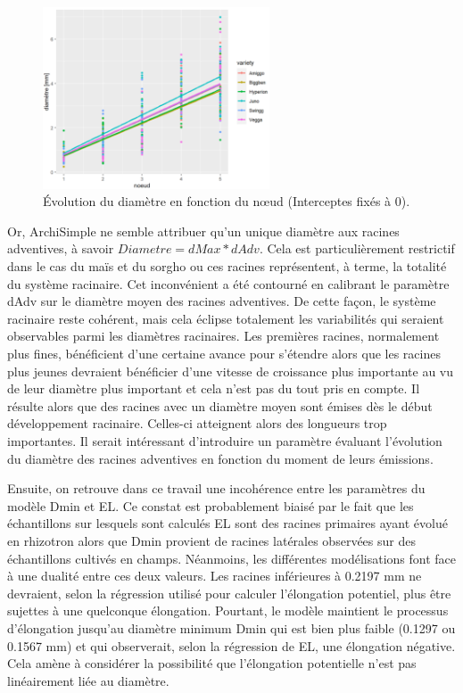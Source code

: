 \begin{figure}[ht]
\centering
\includegraphics[width=0.6\textwidth]{Image/node_dia.png}
\caption{Évolution du diamètre en fonction du nœud (Interceptes fixés à 0).}
\label{fig:node_dia}
\end{figure}

Or, ArchiSimple ne semble attribuer qu'un unique diamètre aux racines adventives, à savoir $Diametre = dMax*dAdv$.
Cela est particulièrement restrictif dans le cas du maïs et du sorgho ou ces racines représentent, à terme, la totalité du système racinaire.
Cet inconvénient a été contourné en calibrant le paramètre dAdv sur le diamètre moyen des racines adventives.
De cette façon, le système racinaire reste cohérent, mais cela éclipse totalement les variabilités qui seraient observables parmi les diamètres racinaires.
Les premières racines, normalement plus fines, bénéficient d'une certaine avance pour s'étendre alors que les racines plus jeunes devraient bénéficier d'une vitesse de croissance plus importante au vu de leur diamètre plus important et cela n'est pas du tout pris en compte.
Il résulte alors que des racines avec un diamètre moyen sont émises dès le début développement racinaire.
Celles-ci atteignent alors des longueurs trop importantes.
Il serait intéressant d'introduire un paramètre évaluant l'évolution du diamètre des racines adventives en fonction du moment de leurs émissions.
\newline

Ensuite, on retrouve dans ce travail une incohérence entre les paramètres du modèle Dmin et EL.
Ce constat est probablement biaisé par le fait que les échantillons sur lesquels sont calculés EL sont des racines primaires ayant évolué en rhizotron alors que Dmin provient de racines latérales observées sur des échantillons cultivés en champs.
Néanmoins, les différentes modélisations font face à une dualité entre ces deux valeurs.
Les racines inférieures à 0.2197 mm ne devraient, selon la régression utilisé pour calculer l'élongation potentiel, plus être sujettes à une quelconque élongation.
Pourtant, le modèle maintient le processus d'élongation jusqu'au diamètre minimum Dmin qui est bien plus faible (0.1297 ou 0.1567 mm) et qui observerait, selon la régression de EL, une élongation négative.
Cela amène à considérer la possibilité que l'élongation potentielle n'est pas linéairement liée au diamètre.
\newline

